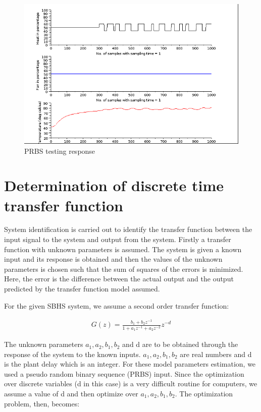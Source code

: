 \begin{figure}
\centering
\includegraphics[width=0.7\linewidth]{prbs/prbs-expt.png}
\caption{PRBS testing response}
\label{prbs-res}
\end{figure}


\section{Determination of discrete time transfer function}\label{prbs-model}

System identification is carried out to identify the transfer function between the input signal to the system and output from the system. Firstly a transfer function with unknown parameters is assumed. The system is given a known input and its response is obtained and then the values of the unknown parameters is chosen such that the sum of squares of the errors is minimized. Here, the error is the difference between the actual output and the output predicted by the transfer function model assumed.



For the given SBHS system, we assume a second order transfer function:

\begin{align}\label{DTF}
G(z)=\frac{b_{1}+b_{2}z^{-1}}{1+a_{1}z^{-1}+a_{2}z^{-2}}z^{-d}
\end{align}


The unknown parameters $a_1, a_2, b_1, b_2$ and d are to be obtained through the response of the system to the known inputs.  $a_1, a_2, b_1, b_2$ are real numbers and d is the plant delay which is an integer.  For these model parameters estimation, we used a pseudo random binary sequence (PRBS) input. Since the optimization over discrete variables (d in this case) is a very difficult routine for computers, we assume a value of d and then optimize over  $a_1, a_2, b_1, b_2$. The optimization problem, then, becomes:



